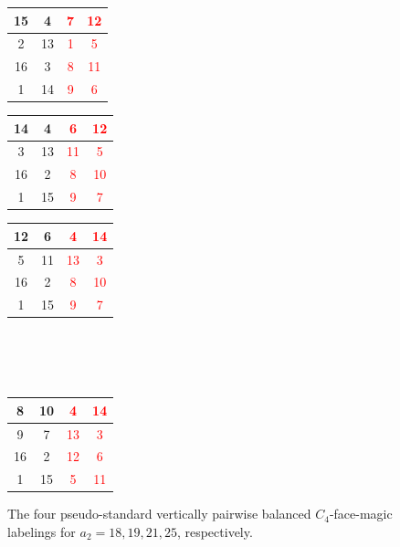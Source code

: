 \documentclass[10pt, reqno]{amsart}
\theoremstyle{definition}
\theoremstyle{plain}
\begin{document}
\begin{figure}[hbt!]
\centering
\begin{tabular}{|c|c|c|c|} \hline
       15  &4  &\textcolor{red}{7}  &\textcolor{red}{12}  \\  \hline
        2  &13   &\textcolor{red}{1}   &\textcolor{red}{5}  \\  \hline
       16  &3   &\textcolor{red}{8}  &\textcolor{red}{11}  \\  \hline
        1  &14  &\textcolor{red}{9}   &\textcolor{red}{6}  \\  \hline
    \end{tabular}
\hspace{0.15in}\begin{tabular}{|c|c|c|c|} \hline
       14  &4  &\textcolor{red}{6}  &\textcolor{red}{12}  \\  \hline
        3  &13   &\textcolor{red}{11}   &\textcolor{red}{5}  \\  \hline
       16  &2   &\textcolor{red}{8}  &\textcolor{red}{10}  \\  \hline
        1  &15  &\textcolor{red}{9} &  \textcolor{red}{7}  \\  \hline
    \end{tabular}
\hspace{0.15in}\begin{tabular}{|c|c|c|c|} \hline
       12  &6  &\textcolor{red}{4}  &\textcolor{red}{14}  \\  \hline
        5  &11   &\textcolor{red}{13}   &\textcolor{red}{3}  \\  \hline
       16  &2   &\textcolor{red}{8}  &\textcolor{red}{10}  \\  \hline
        1  &15  &\textcolor{red}{9}   &\textcolor{red}{7}  \\  \hline
    \end{tabular}
\hspace{2in}\\
\hspace{2in}\\
\hspace{2in}\\
\hspace{0.15in}  \begin{tabular}{|c|c|c|c|} \hline
       8  &10  &\textcolor{red}{4}  &\textcolor{red}{14}  \\  \hline
        9  &7   &\textcolor{red}{13}   &\textcolor{red}{3}  \\  \hline
       16  &2   &\textcolor{red}{12}  &\textcolor{red}{6}  \\  \hline
        1  &15  &\textcolor{red}{5}   &\textcolor{red}{11}  \\  \hline
    \end{tabular}
\caption{The four pseudo-standard  vertically pairwise 
balanced $C_4$-face-magic labelings 
for $a_2=18, 19, 21, 25$, 
respectively.}\label{pseudostandardlabeling12}   
\end{figure} 
\end{document}
